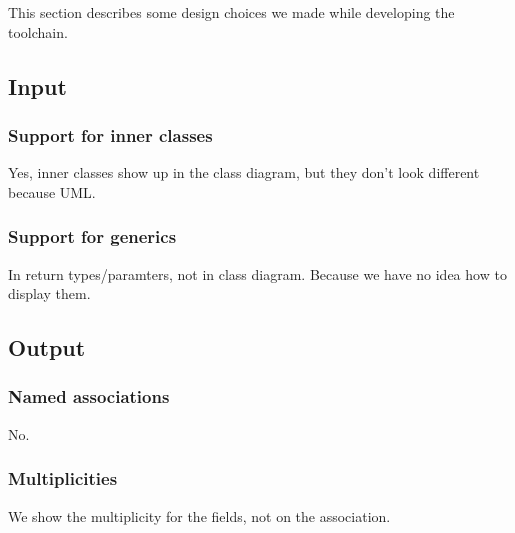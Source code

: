 This section describes some design choices we made while developing the toolchain.

\subsection{Input}
	\subsubsection{Support for inner classes}
		Yes, inner classes show up in the class diagram, but they don't look different because UML.
	\subsubsection{Support for generics}
		In return types/paramters, not in class diagram.
		Because we have no idea how to display them.

\subsection{Output}
	\subsubsection{Named associations}
		No.
	\subsubsection{Multiplicities}
		We show the multiplicity for the fields, not on the association.

